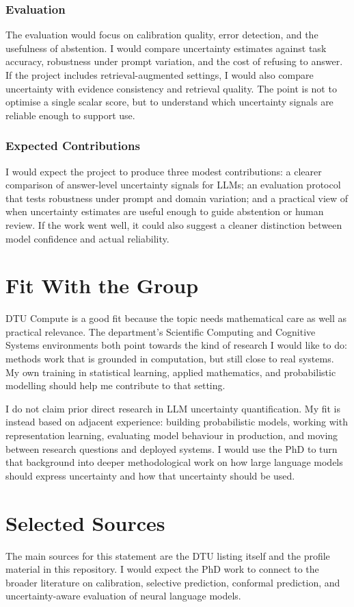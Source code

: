 \documentclass[11pt,a4paper]{article}
\begin{document}
\subsubsection{Evaluation}
The evaluation would focus on calibration quality, error detection, and the usefulness of abstention. I would compare uncertainty estimates against task accuracy, robustness under prompt variation, and the cost of refusing to answer. If the project includes retrieval-augmented settings, I would also compare uncertainty with evidence consistency and retrieval quality. The point is not to optimise a single scalar score, but to understand which uncertainty signals are reliable enough to support use.

\subsubsection{Expected Contributions}
I would expect the project to produce three modest contributions: a clearer comparison of answer-level uncertainty signals for LLMs; an evaluation protocol that tests robustness under prompt and domain variation; and a practical view of when uncertainty estimates are useful enough to guide abstention or human review. If the work went well, it could also suggest a cleaner distinction between model confidence and actual reliability.

\section{Fit With the Group}
DTU Compute is a good fit because the topic needs mathematical care as well as practical relevance. The department's Scientific Computing and Cognitive Systems environments both point towards the kind of research I would like to do: methods work that is grounded in computation, but still close to real systems. My own training in statistical learning, applied mathematics, and probabilistic modelling should help me contribute to that setting.

I do not claim prior direct research in LLM uncertainty quantification. My fit is instead based on adjacent experience: building probabilistic models, working with representation learning, evaluating model behaviour in production, and moving between research questions and deployed systems. I would use the PhD to turn that background into deeper methodological work on how large language models should express uncertainty and how that uncertainty should be used.

\section{Selected Sources}
The main sources for this statement are the DTU listing itself and the profile material in this repository. I would expect the PhD work to connect to the broader literature on calibration, selective prediction, conformal prediction, and uncertainty-aware evaluation of neural language models.
\end{document}
